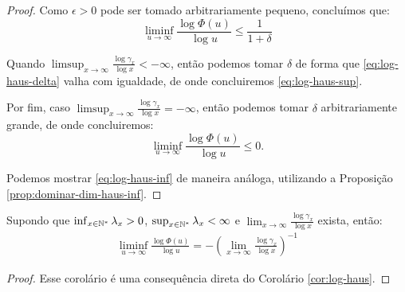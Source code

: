 \begin{proof}
  Como $\epsilon > 0$ pode ser tomado arbitrariamente pequeno,
  concluímos que:
  \begin{displaymath}
    \liminf_{u \to \infty} \frac{\log \Phi(u)}{\log u} \leq
    \frac{1}{1+\delta} 
  \end{displaymath}
  
  Quando $\limsup_{x\to\infty} \frac{\log \gamma_x}{\log x} <
  -\infty$, então podemos tomar $\delta$ de forma que
  \eqref{eq:log-haus-delta} valha com igualdade, de onde concluiremos
  \eqref{eq:log-haus-sup}.

  Por fim, caso $\limsup_{x\to\infty} \frac{\log \gamma_x}{\log x} =
  -\infty$, então podemos tomar $\delta$ arbitrariamente grande, de
  onde concluiremos:
  \begin{displaymath}
    \liminf_{u \to \infty} \frac{\log \Phi(u)}{\log u} \leq 0.
  \end{displaymath}

  Podemos mostrar \eqref{eq:log-haus-inf} de maneira análoga,
  utilizando a Proposição \ref{prop:dominar-dim-haus-inf}.
\end{proof}

\begin{corolario}
  \label{cor:log-haus-igual}
   Supondo que $\inf_{x \in {\mathbb{N^*}}} \lambda_x > 0$, $\sup_{x \in {\mathbb{N^*}}}
  \lambda_x < \infty$ e $\lim_{x\to\infty} \frac{\log \gamma_x}{\log
    x}$ exista, então:
  \begin{gather}
    \label{eq:log-haus-igual}
    \liminf_{u \to \infty} \frac{\log \Phi(u)}{\log u} =
    - \left( \lim_{x \to \infty} \frac{\log \gamma_x}{\log x}
    \right)^{-1}
  \end{gather}
\end{corolario}
\begin{proof}
  Esse corolário é uma consequência direta do Corolário
  \ref{cor:log-haus}.
\end{proof}

